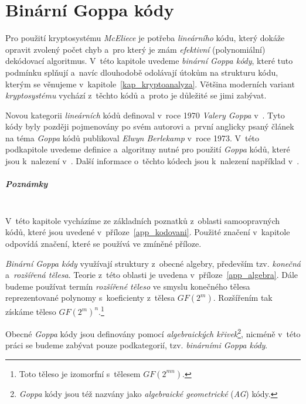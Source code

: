 \documentclass[thesis=M,czech,hidelinks]{FITthesis}[2012/06/26]
\newcommand{\0}{{\textcolor[gray]{0.75}{0}}}
\begin{document}
\chapter{Binární Goppa kódy}\label{kap_goppa_kody}

Pro použití kryptosystému \emph{McEliece} je potřeba \emph{lineárního} kódu,
který dokáže opravit zvolený počet chyb a~pro který je znám \emph{efektivní}
(polynomiální) dekódovací algoritmus. V~této kapitole uvedeme \emph{binární
Goppa kódy}, které tuto podmínku splňují a~navíc dlouhodobě odolávají
útokům na strukturu kódu, kterým se věnujeme v~kapitole~\ref{kap_kryptoanalyza}.
Většina moderních variant \emph{kryptosystému} vychází z~těchto kódů a~proto je
důležité se jimi zabývat.

Novou kategorii \emph{lineárních} kódů definoval v~roce 1970 \emph{Valery Goppa}
v~\cite{Goppa}. Tyto kódy byly později pojmenovány po svém autorovi a~první
anglicky psaný článek na téma \emph{Goppa} kódů publikoval \emph{Elwyn
Berlekamp} v~roce 1973. V~této podkapitole uvedeme definice a~algoritmy nutné
pro použití \emph{Goppa} kódů, které jsou k~nalezení
v~\cite{Berlekamp2,Engelbert}. Další informace o~těchto kódech jsou k~nalezení
například v~\cite{McEliece_coding}.

\vfil


\paragraph{Poznámky} \hfil \\
V~této kapitole vycházíme ze základních poznatků z~oblasti
samoopravných kódů, které jsou uvedené v~příloze~\ref{app_kodovani}. Použité
značení v~kapitole odpovídá značení, které se používá ve zmíněné příloze.

\emph{Binární Goppa kódy} využívají struktury z~obecné algebry, především tzv.
\emph{konečná} a~\emph{rozšířená tělesa}. Teorie z~této oblasti je uvedena
v~příloze~\ref{app_algebra}. Dále budeme používat termín \emph{rozšířené
těleso} ve smyslu konečného tělesa reprezentované polynomy s~koeficienty
z~tělesa $GF(2^m)$.  Rozšířením tak získáme těleso $GF(2^m)^n$.\footnote{
    Toto těleso je izomorfní s~tělesem  $GF(2^{mn})$.
}

Obecné \emph{Goppa} kódy jsou definovány pomocí
\emph{algebraických křivek}\footnote{
    \emph{Goppa} kódy jsou též nazvány jako \emph{algebraické geometrické}
    (\emph{AG}) kódy.
}, nicméně v~této práci se budeme zabývat pouze podkategorií, tzv.
\emph{binárními Goppa kódy}.
\end{document}
